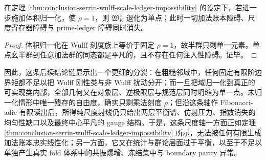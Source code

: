 \begin{corollary}[体积归一化是同态障碍的精确切断]\label{cor:conclusion-serrin-wulff-volume-normalization-cuts-ledger-obstruction}
在定理 \ref{thm:conclusion-serrin-wulff-scale-ledger-impossibility} 的设定下，若进一步施加体积归一化，使 \(\rho=1\)，则 \(\mathfrak W_K^{\times}\) 退化为单点；此时一切加法账本障碍、尺度寄存器障碍与 prime-ledger 障碍同时消失。
\end{corollary}
\begin{proof}
体积归一化在 Wulff 刻度族上等价于固定 \(\rho=1\)，故半群只剩单一元素。单点幺半群到任意加法群的同态都是平凡的，且不存在任何注入性障碍。证毕。
\end{proof}




\noindent
因此，这条后续结论链显示出一个更细的分裂：在粗糙邻域中，任何固定有限阶边界矩都不足以把 Wulff 刚性类与非 Wulff 扰动分开；而一旦把域归一化到真正的可实现类内部，全部几何又在对象层、逆极限层与规范层同时坍缩为单一点。未归一化情形中唯一残存的自由度，确实只剩乘法刻度 \(\rho\)；但沿这条轴作 Fibonacci-adic 有限读出后，所得纯尺度射线仍只给出两层平衡谱、仿射压力、指数消失的均匀性缺口以及最终中心平凡的 gauge 结构。于是，这条尺度轴一方面正如定理 \ref{thm:conclusion-serrin-wulff-scale-ledger-impossibility} 所示，无法被任何有限生成加法账本忠实线性化；另一方面，它又在统计与群论层面过于平衡，以至于不足以单独产生真实 fold 体系中的共振爆增、冻结集中与 boundary parity 异常。

\endinput
